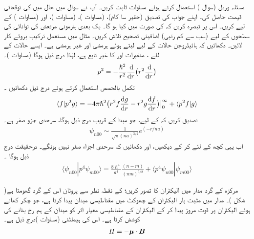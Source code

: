   
مسئلہ وریل (سوال )  استعمال کرتے ہوئے مساوات    ثابت کریں۔ 
آپ نے سوال    میں حال  میں   کی توقعاتی قیمت حاصل کی۔ اپنے جواب کی تصدیق  (حقیر  سا کام)،   (مساوات )،   (مساوات )،   اور  (مساوات ) کے لیے کریں۔ اس پر تبصرہ کریں کہ   کی صورت میں کیا ہو گا۔
 یک بعدی ہارمونی مرتعش کی توانائی کی سطحوں کے لیے (سب سے کم رتبی)  اضافیتی تصحیح تلاش کریں۔  مثال    میں مستعمل ترکیب بروئے کار لائیں۔ 
دکھائیں کہ ہائیڈروجن حالات کے لیے  لیتے ہوئے  ہرمشی  اور   غیر ہرمشی  ہے۔  ایسے  حالات کے لئے ،  متغیرات  اور  کا غیر تابع ہے،   لہٰذا   درج ذیل ہوگا  (مساوات )۔
\begin{align*}
p^2 = - \frac{\hslash^2}{r^2} \frac{\dif }{\dif r} \big ( r^2 \frac{\dif}{\dif r} \big )
\end{align*}
تکمل بالحصص استعمال کرتے ہوئے درج ذیل دکھائیں ۔
\begin{align*}
\langle f | p^2 g \rangle = - 4 \pi \hslash^2 
\big ( r^2 f \frac{\dif g}{\dif r} - r^2 g \frac{\dif f}{\dif r} \big ) \big \rvert_0^{\infty} + \langle p^2 f | g \rangle 
\end{align*}
تصدیق کریں  کہ  کے لیے، جو مبدا کے قریب درج ذیل ہوگا، سرحدی جزو صفر ہے۔
\begin{align*}
\psi_{n00} \sim \frac{1}{\sqrt{\pi} (na)^{3/2}} e^{(-r/na)}
\end{align*}
اب یہی کچھ  کے لئے کر کے دیکھیں،  اور دکھائیں  کہ سرحدی اجزاء صفر نہیں ہونگے۔  درحقیقت درج ذیل ہوگا ۔
\begin{align*}
\langle \psi_{n00} | p^4 \psi_{m00} \rangle = \frac{8\hslash^4}{a^4} \frac{(n - m)}{(nm)^{5/2}} + \langle p^4 \psi_{n00} | \psi_{m00} \rangle
\end{align*}


مرکزہ کے گرد مدار میں الیکٹران کا تصور کریں؛    کے نقطہ نظر سے پروٹان اس کے گرد گھومتا ہے( شکل )۔   مدار میں مثبت بار الیکٹران کے چھوکٹ میں مقناطیسی میدان    پیدا کرتا ہے،  جو چکر کھاتے ہوئے الیکٹران پر  قوت مروڑ   پیدا کر کے الیکٹران کے مقناطیسی معیار اثر  کو میدان کے ہم رخ بنانے کی کوشش کرتا ہے۔  اس کی ہیملٹنی (مساوات )درج ذیل ہے۔
\begin{align}
H = - {{\boldsymbol{\mu}}} \cdot {\ensuremath{{\boldsymbol{B}}}}
\end{align}

